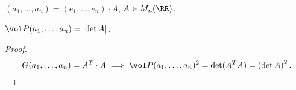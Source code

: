 \documentclass[a4paper]{article}
\begin{document}
\begin{colloq}
            $(a_1, \dots, a_n) = (e_1, \dots, e_n) \cdot A$, $A \in M_n(\RR)$.

            \begin{proposal}
                $\vol P(a_1, \dots, a_n) = \left|\det A\right|$.
            \end{proposal}

            \begin{proof}
                \begin{equation*}
                    G(a_1, \dots, a_n) = A^{T} \cdot A \implies \vol P(a_1, \dots, a_n)^2 = \det (A^{T} A) = \left(\det A\right)^2
                    \qedhere
                .\end{equation*}
            \end{proof}

    \end{colloq}
\end{document}
